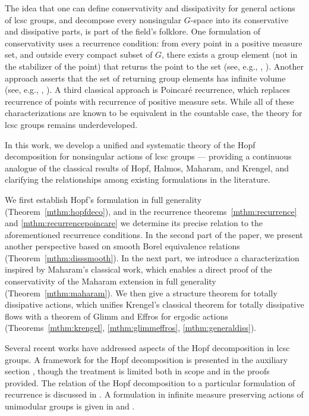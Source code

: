 \documentclass{amsart}
\numberwithin{equation}{subsection}
\begin{document}
The idea that one can define conservativity and dissipativity for general actions of lcsc groups, and decompose every nonsingular \(G\)-space into its conservative and dissipative parts, is part of the field’s folklore. One formulation of conservativity uses a recurrence condition: from every point in a positive measure set, and outside every compact subset of \(G\), there exists a group element (not in the stabilizer of the point) that returns the point to the set (see, e.g., \cite[Definition 2.1]{danilenko2022haagerup}, \cite[\S6.3]{danilenko2022nonsingular}). Another approach asserts that the set of returning group elements has infinite volume (see, e.g., \cite[\S4.6, p.40]{quint2006overview}, \cite[\S1E]{Roblin2003}). A third classical approach is Poincar\'{e} recurrence, which replaces recurrence of points with recurrence of positive measure sets. While all of these characterizations are known to be equivalent in the countable case, the theory for lcsc groups remains underdeveloped.

In this work, we develop a unified and systematic theory of the Hopf decomposition for nonsingular actions of lcsc groups — providing a continuous analogue of the classical results of Hopf, Halmos, Maharam, and Krengel, and clarifying the relationships among existing formulations in the literature. 

We first establish Hopf’s formulation in full generality (Theorem~\ref{mthm:hopfdeco}), and in the recurrence theorems~\ref{mthm:recurrence} and \ref{mthm:recurrencepoincare} we determine its precise relation to the aforementioned recurrence conditions. In the second part of the paper, we present another perspective based on smooth Borel equivalence relations (Theorem~\ref{mthm:disssmooth}). In the next part, we introduce a characterization inspired by Maharam’s classical work, which enables a direct proof of the conservativity of the Maharam extension in full generality (Theorem~\ref{mthm:maharam}). We then give a structure theorem for totally dissipative actions, which unifies Krengel’s classical theorem for totally dissipative flows with a theorem of Glimm and Effros for ergodic actions (Theorems~\ref{mthm:krengel}, \ref{mthm:glimmeffros}, \ref{mthm:generaldiss}).

Several recent works have addressed aspects of the Hopf decomposition in lcsc groups. A framework for the Hopf decomposition is presented in the auxiliary section \cite[\S4.10]{arano2021ergodic}, though the treatment is limited both in scope and in the proofs provided. The relation of the Hopf decomposition to a particular formulation of recurrence is discussed in \cite[\S2.1]{berendschot2024phase}. A formulation in infinite measure preserving actions of unimodular groups is given in \cite[\S2.11]{blayac2025patterson} and \cite[Appendix~A]{blayac2024patterson}.
\end{document}
